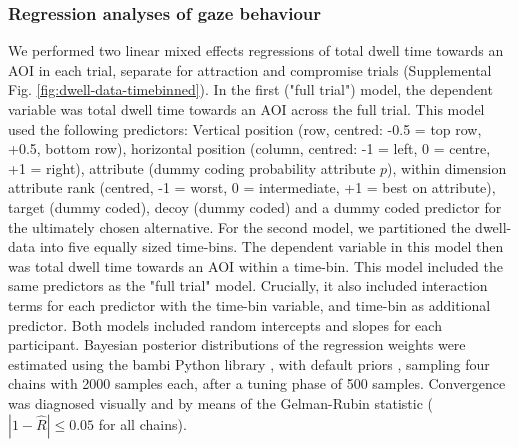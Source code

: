 \documentclass[11pt, a4paper]{article}
\begin{document}
\begin{refsection}
\subsubsection*{Regression analyses of gaze behaviour}
We performed two linear mixed effects regressions of total dwell time towards an AOI in each trial, separate for attraction and compromise trials (Supplemental Fig. \ref{fig:dwell-data-timebinned}). In the first ("full trial") model, the dependent variable was total dwell time towards an AOI across the full trial. This model used the following predictors: Vertical position (row, centred: -0.5 = top row, +0.5, bottom row), horizontal position (column, centred: -1 = left, 0 = centre, +1 = right), attribute (dummy coding probability attribute $p$), within dimension attribute rank (centred, -1 = worst, 0 = intermediate, +1 = best on attribute), target (dummy coded), decoy (dummy coded) and a dummy coded predictor for the ultimately chosen alternative. For the second model, we partitioned the dwell-data into five equally sized time-bins. The dependent variable in this model then was total dwell time towards an AOI within a time-bin. This model included the same predictors as the "full trial" model. Crucially, it also included interaction terms for each predictor with the time-bin variable, and time-bin as additional predictor. Both models included random intercepts and slopes for each participant. Bayesian posterior distributions of the regression weights were estimated using the bambi Python library \autocite{yarkoni2016BambiSimpleInterface}, with default priors \autocite{westfall2017StatisticalDetailsDefault}, sampling four chains with 2000 samples each, after a tuning phase of 500 samples. Convergence was diagnosed visually and by means of the Gelman-Rubin statistic ($|1 - \hat{R}| \le 0.05$ for all chains).


\end{refsection}
\end{document}
